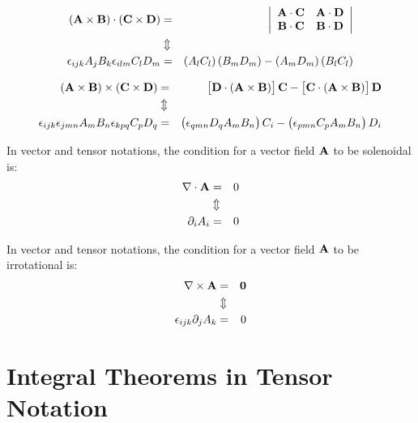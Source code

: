 \begin{eqnarray}
\left(\mathbf{ A}\times\mathbf{ B}\right)\cdot\left(\mathbf{ C}\times\mathbf{ D}
\right) & = & \begin{vmatrix}\begin{array}{cc}
\mathbf{ A}\cdot\mathbf{ C} & \mathbf{ A}\cdot\mathbf{ D}\\
\mathbf{ B}\cdot\mathbf{ C} & \mathbf{ B}\cdot\mathbf{ D}
\end{array}\end{vmatrix}\nonumber \\
 & \Updownarrow\\
\epsilon_{ijk}A_{j}B_{k}\epsilon_{ilm}C_{l}D_{m} & = & 
\left(A_{l}C_{l}\right)\left(B_{m}D_{m}\right)-\left(A_{m}D_{m}\right)\left(B_{l
}C_{l}\right)\nonumber
\end{eqnarray}



\begin{eqnarray}
\left(\mathbf{ A}\times\mathbf{ B}\right)\times\left(\mathbf{ C}\times\mathbf{ D}
\right) & = & 
\left[\mathbf{ D}\cdot\left(\mathbf{ A}\times\mathbf{ B}\right)\right]\mathbf{ C}
-\left[\mathbf{ C}\cdot\left(\mathbf{ A}\times\mathbf{ B}\right)\right]\mathbf{ D}
\nonumber \\
 & \Updownarrow\\
\epsilon_{ijk}\epsilon_{jmn}A_{m}B_{n}\epsilon_{kpq}C_{p}D_{q} & = & 
\left(\epsilon_{qmn}D_{q}A_{m}B_{n}\right)C_{i}-\left(\epsilon_{pmn}C_{p}A_{m}B_
{n}\right)D_{i}\nonumber
\end{eqnarray}


 In vector and tensor notations, the condition for a vector
field $\mathbf{ A}$ to be solenoidal is:
\begin{eqnarray}
\nabla\cdot\mathbf{ A} & = & 0\nonumber \\
 & \Updownarrow\\
\partial_{i}A_{i} & = & 0\nonumber
\end{eqnarray}


 In vector and tensor notations, the condition for a vector
field $\mathbf{ A}$ to be irrotational is:
\begin{eqnarray}
\nabla\times\mathbf{ A} & = & \mathbf{ 0}\nonumber \\
 & \Updownarrow\\
\epsilon_{ijk}\partial_{j}A_{k} & = & 0\nonumber
\end{eqnarray}



\section{Integral Theorems in Tensor Notation}

